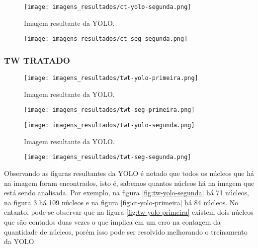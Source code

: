 \begin{figure}[!h]
    \centering
    \texttt{[image: imagens\_resultados/ct-yolo-segunda.png]}
    \caption{Imagem resultante da YOLO.}
    \label{fig:ct-yolo-segunda}
\end{figure}

\begin{figure}[!h]
    \centering
    \texttt{[image: imagens\_resultados/ct-seg-segunda.png]}
    \caption{}
    \label{fig:ct-seg-segunda}
\end{figure}

\subsubsection{TW TRATADO}

\begin{figure}[!h]
    \centering
    \texttt{[image: imagens\_resultados/twt-yolo-primeira.png]}
    \caption{Imagem resultante da YOLO.}
    \label{fig:twt-yolo-primeira}
\end{figure}

\begin{figure}[!h]
    \centering
    \texttt{[image: imagens\_resultados/twt-seg-primeira.png]}
    \caption{}
    \label{fig:twt-seg-primeira}
\end{figure}

\begin{figure}[!h]
    \centering
    \texttt{[image: imagens\_resultados/twt-yolo-segunda.png]}
    \caption{Imagem resultante da YOLO.}
    \label{fig:twt-yolo-segunda}
\end{figure}

\begin{figure}[!h]
    \centering
    \texttt{[image: imagens\_resultados/twt-seg-segunda.png]}
    \caption{}
    \label{fig:twt-seg-segunda}
\end{figure}

Observando as figuras resultantes da YOLO é notado que todos os núcleos que há na imagem foram encontrados, isto é, sabemos quantos núcleos há na imagem que está sendo analisada. Por exemplo, na figura \ref{fig:tw-yolo-segunda} há 71 núcleos, na figura \ref{fig:twt-yolo-primeira} há 109 núcleos e na figura \ref{fig:ct-yolo-primeira} há 84 núcleos. No entanto, pode-se observar que na figura \ref{fig:tw-yolo-primeira} existem dois núcleos que são contados duas vezes o que implica em um erro na contagem da quantidade de núcleos, porém isso pode ser resolvido melhorando o treinamento da YOLO.

